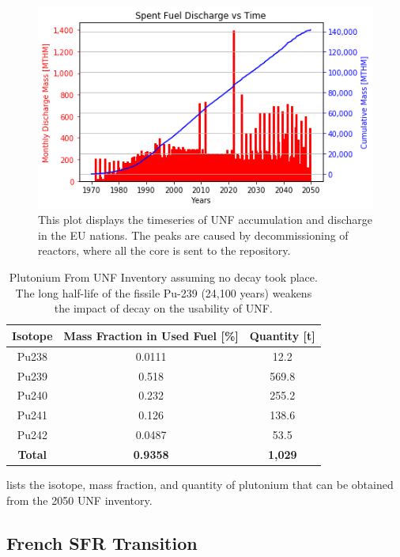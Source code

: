 \begin{figure}[htbp!]
	\begin{center}
			\includegraphics[scale=0.7]{./images/eu_future/snf_discharge.png}
	\end{center}
	\caption{This plot displays the timeseries of \gls{UNF} accumulation and discharge in the \gls{EU} nations.
			 The peaks are caused by decommissioning of reactors, where all the core is sent to the repository.}
	\label{fig:eu_snf}
\end{figure}
\FloatBarrier


\begin{table}[h]
	\centering
	\begin{tabular}{ccc}
		\hline
		\textbf{Isotope} & \textbf{Mass Fraction in Used Fuel [\%]} & \textbf{Quantity [t]} \\ \hline
		Pu238 & 0.0111 & 12.2 \\ 
		Pu239 & 0.518 & 569.8 \\ 
		Pu240 & 0.232 & 255.2 \\ 
		Pu241 & 0.126 & 138.6 \\ 
		Pu242 & 0.0487 & 53.5 \\ \hline
		\textbf{Total} & \textbf{0.9358} & \textbf{1,029} \\ \hline
	\end{tabular}
	\caption{Plutonium From \gls{UNF} Inventory assuming no decay
			 took place. The long half-life of the fissile Pu-239 (24,100 years)
			 weakens the impact of decay on the usability of \gls{UNF}.}
	\label{tab:pu}
\end{table}


 lists the isotope, mass fraction,
and quantity of plutonium that can be obtained from the 2050 \gls{UNF} inventory.


\subsection{French \gls{SFR} Transition}

